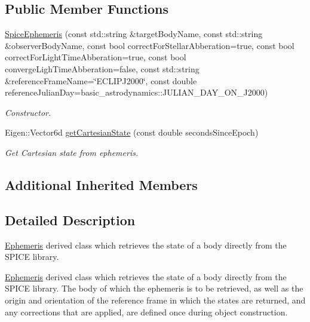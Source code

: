 \subsection*{Public Member Functions}
\begin{DoxyCompactItemize}
\item 
\hyperlink{classtudat_1_1ephemerides_1_1SpiceEphemeris_aeaecc8bbda1e7c713872a34f980bdea8}{Spice\+Ephemeris} (const std\+::string \&target\+Body\+Name, const std\+::string \&observer\+Body\+Name, const bool correct\+For\+Stellar\+Abberation=true, const bool correct\+For\+Light\+Time\+Abberation=true, const bool converge\+Ligh\+Time\+Abberation=false, const std\+::string \&reference\+Frame\+Name=\char`\"{}E\+C\+L\+I\+P\+J2000\char`\"{}, const double reference\+Julian\+Day=basic\+\_\+astrodynamics\+::\+J\+U\+L\+I\+A\+N\+\_\+\+D\+A\+Y\+\_\+\+O\+N\+\_\+\+J2000)
\begin{DoxyCompactList}\small\item\em Constructor. \end{DoxyCompactList}\item 
Eigen\+::\+Vector6d \hyperlink{classtudat_1_1ephemerides_1_1SpiceEphemeris_aef29e7e00cb70ad756d6c329f1edc712}{get\+Cartesian\+State} (const double seconds\+Since\+Epoch)
\begin{DoxyCompactList}\small\item\em Get Cartesian state from ephemeris. \end{DoxyCompactList}\end{DoxyCompactItemize}
\subsection*{Additional Inherited Members}


\subsection{Detailed Description}
\hyperlink{classtudat_1_1ephemerides_1_1Ephemeris}{Ephemeris} derived class which retrieves the state of a body directly from the S\+P\+I\+CE library. 

\hyperlink{classtudat_1_1ephemerides_1_1Ephemeris}{Ephemeris} derived class which retrieves the state of a body directly from the S\+P\+I\+CE library. The body of which the ephemeris is to be retrieved, as well as the origin and orientation of the reference frame in which the states are returned, and any corrections that are applied, are defined once during object construction. 

